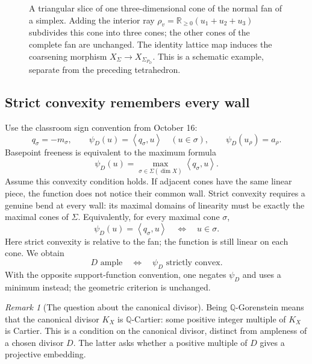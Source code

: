 \documentclass[11pt]{article}
\theoremstyle{definition}
\theoremstyle{remark}
\newtheorem{Rmk}{Remark}
\newcommand{\Sg}{\Sigma}
\newcommand{\braket}[2]{\left\langle #1,#2\right\rangle}
\newcommand{\bQ}{\mathbb{Q}}
\begin{document}
\begin{figure}[htbp]
    \caption{A triangular slice of one three-dimensional cone of the normal
    fan of a simplex. Adding the interior ray
    \(\rho_v=\mathbb{R}_{\geq0}(u_1+u_2+u_3)\) subdivides this cone into
    three cones; the other cones of the complete fan are unchanged.
    The identity lattice map induces the coarsening morphism
    \(X_\Sigma\longrightarrow X_{\Sigma_{P_D}}\).
    This is a schematic example, separate from the preceding tetrahedron.}
    \label{fig:oct19-diagram7}
\end{figure}

\subsection{Strict convexity remembers every wall}

Use the classroom sign convention from October 16:
\[
    q_\sigma=-m_\sigma,\qquad
    \psi_D(u)=\braket{q_\sigma}{u}\quad(u\in\sigma),
    \qquad\psi_D(u_\rho)=a_\rho.
\]
Basepoint freeness is equivalent to the maximum formula
\[
    \psi_D(u)=\max_{\sigma\in\Sg(\dim X)}
                       \braket{q_\sigma}{u}.
\]
Assume this convexity condition holds. If adjacent cones have the
same linear piece, the function does not
notice their common wall. Strict convexity requires a genuine bend
at every wall: its maximal domains of linearity must be exactly the
maximal cones of \(\Sg\). Equivalently, for every maximal cone
\(\sigma\),
\[
    \psi_D(u)=\braket{q_\sigma}{u}
       \quad\Longleftrightarrow\quad u\in\sigma.
\]
Here strict convexity is relative to the fan; the function is
still linear on each cone. We obtain
\[
    D\text{ ample}\quad\Longleftrightarrow\quad
    \psi_D\text{ strictly convex}.
\]
With the opposite support-function convention, one negates
\(\psi_D\) and uses a minimum instead; the geometric criterion is
unchanged.

\begin{Rmk}[The question about the canonical divisor]
    Being \(\bQ\)-Gorenstein means that the canonical divisor \(K_X\)
    is \(\bQ\)-Cartier: some positive integer multiple of \(K_X\)
    is Cartier. This is a condition on the canonical divisor, distinct
    from ampleness of a chosen divisor \(D\). The latter asks whether
    a positive multiple of \(D\) gives a projective embedding.
\end{Rmk}
\end{document}
